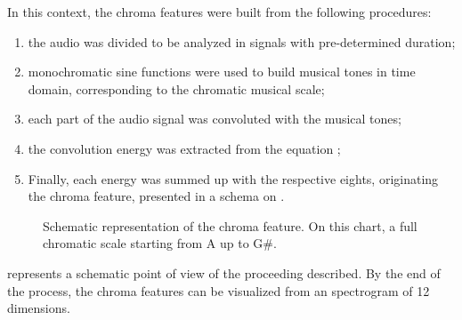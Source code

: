 \documentclass{article}
\begin{document}
	In this context, the chroma features were built from the following procedures:
	\begin{enumerate}
		\item the audio was divided to be analyzed in signals with pre-determined duration;
		\item monochromatic sine functions were used to build musical tones in time domain, corresponding to the chromatic musical scale;
		\item each part of the audio signal was convoluted with the musical tones;
		\item the convolution energy was extracted from the equation ;
		\item Finally, each energy was summed up with the respective eights, originating the chroma feature, presented in a schema on .
	\end{enumerate}

	
	\begin{figure}[h!]
		 \centerline{}
		 \caption{Schematic representation of the chroma feature. On this chart, a full chromatic scale starting from A up to G\#.}
		 \label{fig:chroma_feature}
		\end{figure}

	 represents a schematic point of view of the proceeding described. By the end of the process, the chroma features can be visualized from an spectrogram of 12 dimensions.
\end{document}
